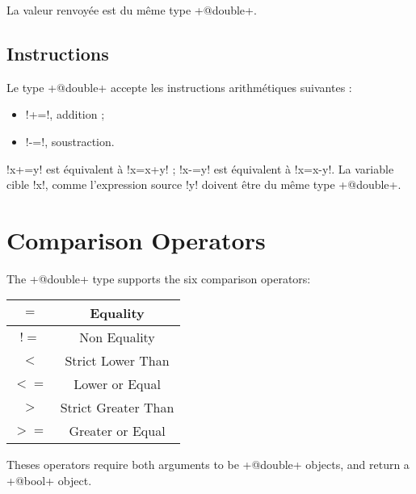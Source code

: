 La valeur renvoyée est du même type  \ggs+@double+.


\subsection{Instructions}

Le type \ggs+@double+ accepte les instructions arithmétiques suivantes :
\begin{itemize}
  \item \ggs!+=!, addition ;
  \item \ggs!-=!, soustraction.
\end{itemize}

\ggs!x+=y! est équivalent à \ggs!x=x+y! ; \ggs!x-=y! est équivalent à \ggs!x=x-y!.
La variable cible \ggs!x!, comme l'expression source \ggs!y! doivent être du même type \ggs+@double+. 







\section{Comparison Operators}

The \ggs+@double+ type supports the six comparison operators:\newline

\begin{tabular}{|c|c|}
\hline
$=$ & Equality \\
\hline
$!=$ & Non Equality \\
\hline
$<$  & Strict Lower Than \\
\hline
$<=$  & Lower or Equal \\
\hline
$>$  & Strict Greater Than \\
\hline
$>=$  & Greater or Equal \\
\hline
\end{tabular}

Theses operators require both arguments to be \ggs+@double+ objects, and return a \ggs+@bool+ object.


